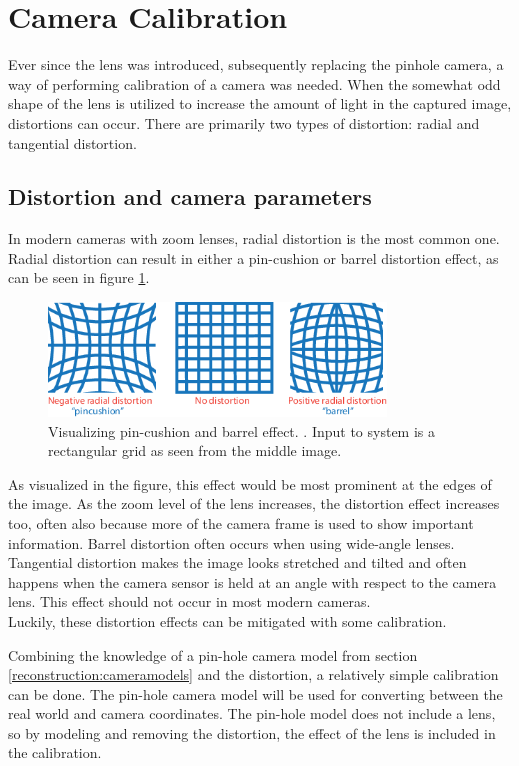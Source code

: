 \newpage
\section{Camera Calibration}
Ever since the lens was introduced, subsequently replacing the pinhole camera, a way of performing calibration of a camera was needed. When the somewhat odd shape of the lens is utilized to increase the amount of light in the captured image, distortions can occur. There are primarily two types of distortion: radial and tangential distortion.
\subsection{Distortion and camera parameters} \label{theory:cameracalib}
In modern cameras with zoom lenses, radial distortion is the most common one. Radial distortion can result in either a pin-cushion or barrel distortion effect, as can be seen in figure \ref{fig:lensdistortiongraphic}.
\begin{figure}[h]
    \centering
    \includegraphics[width=0.8\textwidth]{figures/CameraCalibration/calibration_radial_distortion.png}
    \caption{Visualizing pin-cushion and barrel effect. \cite{lensdistortiongraphic}. Input to system is a rectangular grid as seen from the middle image.}
    \label{fig:lensdistortiongraphic}
\end{figure}
As visualized in the figure, this effect would be most prominent at the edges of the image. As the zoom level of the lens increases, the distortion effect increases too, often also because more of the camera frame is used to show important information. Barrel distortion often occurs when using wide-angle lenses. 
Tangential distortion makes the image looks stretched and tilted and often happens when the camera sensor is held at an angle with respect to the camera lens. This effect should not occur in most modern cameras. \\

Luckily, these distortion effects can be mitigated with some calibration. 


Combining the knowledge of a pin-hole camera model from section \ref{reconstruction:cameramodels} and the distortion, a relatively simple calibration can be done. The pin-hole camera model will be used for converting between the real world and camera coordinates. The pin-hole model does not include a lens, so by modeling and removing the distortion, the effect of the lens is included in the calibration. 

